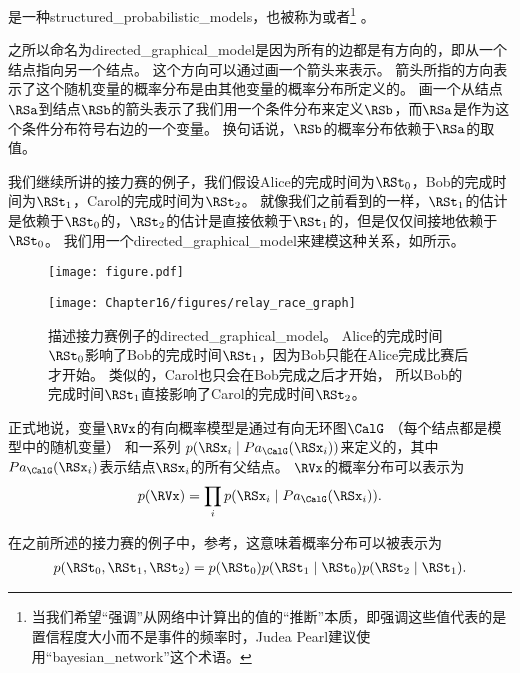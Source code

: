 是一种\gls{structured_probabilistic_models}，也被称为或者\footnote{当我们希望``强调''从网络中计算出的值的``推断''本质，即强调这些值代表的是置信程度大小而不是事件的频率时，Judea Pearl建议使用``\gls{bayesian_network}''这个术语。}%
 \citep{pearl85bayesian}。


之所以命名为\gls{directed_graphical_model}是因为所有的边都是有方向的，即从一个结点指向另一个结点。
这个方向可以通过画一个箭头来表示。
箭头所指的方向表示了这个随机变量的概率分布是由其他变量的概率分布所定义的。
画一个从结点$\RSa$到结点$\RSb$的箭头表示了我们用一个条件分布来定义$\RSb$，而$\RSa$是作为这个条件分布符号右边的一个变量。
换句话说，$\RSb$的概率分布依赖于$\RSa$的取值。


我们继续所讲的接力赛的例子，我们假设Alice的完成时间为$\RSt_0$，Bob的完成时间为$\RSt_1$，Carol的完成时间为$\RSt_2$。
就像我们之前看到的一样，$\RSt_1$的估计是依赖于$\RSt_0$的，$\RSt_2$的估计是直接依赖于$\RSt_1$的，但是仅仅间接地依赖于$\RSt_0$。
我们用一个\gls{directed_graphical_model}来建模这种关系，如所示。


\begin{figure}[!htb]
\ifOpenSource
\centerline{\texttt{[image: figure.pdf]}}
\else
\centerline{\texttt{[image: Chapter16/figures/relay\_race\_graph]}}	
\fi
\caption{描述接力赛例子的\gls{directed_graphical_model}。
Alice的完成时间$\RSt_0$影响了Bob的完成时间$\RSt_1$，因为Bob只能在Alice完成比赛后才开始。
类似的，Carol也只会在Bob完成之后才开始，
所以Bob的完成时间$\RSt_1$直接影响了Carol的完成时间$\RSt_2$。}
\label{fig:relay_race_graph}
\end{figure}


正式地说，变量$\RVx$的有向概率模型是通过有向无环图$\CalG$ （每个结点都是模型中的随机变量）
和一系列 $p(\RSx_i\mid Pa_{\CalG}(\RSx_i))$来定义的，其中$Pa_{\CalG}(\RSx_i)$表示结点$\RSx_i$的所有父结点。
$\RVx$的概率分布可以表示为
\begin{align}
\label{eqn:161}
p(\RVx) = \prod_{i} p(\RSx_i\mid Pa_{\CalG}(\RSx_i)).
\end{align}


在之前所述的接力赛的例子中，参考，这意味着概率分布可以被表示为
\begin{align}
\label{eqn:162}
p(\RSt_0,\RSt_1,\RSt_2) = p(\RSt_0)p(\RSt_1\mid \RSt_0)p(\RSt_2\mid \RSt_1).
\end{align}


